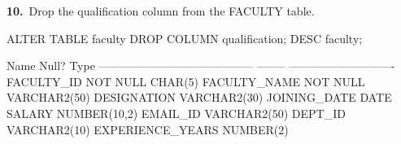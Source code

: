 
\noindent\begin{minipage}{\linewidth}
\begingroup{}
{\fontsize{14}{17}\selectfont\textbf{10.}}\ Drop the qualification column from the FACULTY table.\par
\endgroup\vspace{12pt}


\begin{sqlcode}
ALTER TABLE faculty DROP COLUMN qualification;
DESC faculty;
\end{sqlcode}

\vspace{18pt}


\begin{sqlout}
 Name                                      Null?    Type
 ----------------------------------------- -------- ----------------------------
 FACULTY_ID                                NOT NULL CHAR(5)
 FACULTY_NAME                              NOT NULL VARCHAR2(50)
 DESIGNATION                                        VARCHAR2(30)
 JOINING_DATE                                       DATE
 SALARY                                             NUMBER(10,2)
 EMAIL_ID                                           VARCHAR2(50)
 DEPT_ID                                            VARCHAR2(10)
 EXPERIENCE_YEARS                                   NUMBER(2)
\end{sqlout}
\end{minipage}\par\vspace{30pt}

